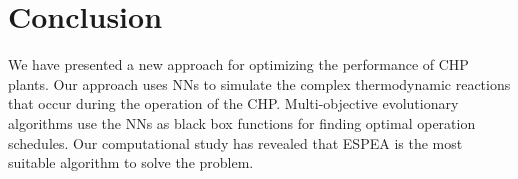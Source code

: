 \section{Conclusion}

We have presented a new approach for optimizing the performance of CHP plants. Our approach uses NNs to simulate the complex thermodynamic reactions that occur during the operation of the CHP. Multi-objective evolutionary algorithms use the NNs as black box functions for finding optimal operation schedules. Our computational study has revealed that ESPEA is the most suitable algorithm to solve the problem. 